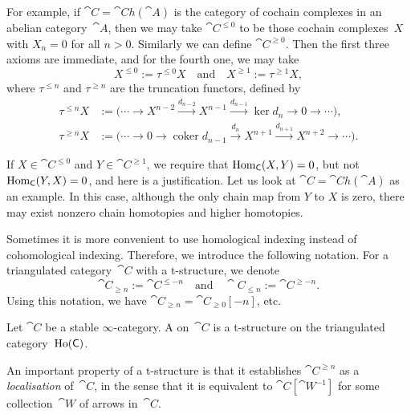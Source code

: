 For example, if $\cat{C}=\cat{Ch}(\cat{A})$ is the category of
cochain complexes in an abelian category~$\cat{A}$,
then we may take $\cat{C}^{\leq0}$ to be those cochain complexes~$X$
with $X_n=0$ for all $n>0$. Similarly we can define $\cat{C}^{\geq0}$.
Then the first three axioms are immediate, and for the fourth one, we may take 
\[ X^{\leq0}:=\tau^{\leq0}X\quad\text{and}\quad X^{\geq1}:=\tau^{\geq1}X, \]
where $\tau^{\leq n}$ and $\tau^{\geq n}$ are the truncation functors, defined by
\[ \begin{aligned}
    \tau^{\leq n}X&:=\bigl(\cdots\to X^{n-2}\xrightarrow{d_{n-2}}X^{n-1}\xrightarrow{d_{n-1}}
    \operatorname{ker}d_{n}\to0\to\cdots\bigr), \\
    \tau^{\geq n}X&:=\bigl(\cdots\to0\to\operatorname{coker}d_{n-1}\xrightarrow{d_n}X^{n+1}
    \xrightarrow{d_{n+1}}X^{n+2}\to\cdots\bigr).
\end{aligned} \]

\begin{remark}
    If $X\in\cat{C}^{\leq0}$ and $Y\in\cat{C}^{\geq1}$, we require that
    $\operatorname{Hom}_{\mathsf{C}}(X,Y)=0$, but not $\operatorname{Hom}_{\mathsf{C}}(Y,X)=0$,
    and here is a justification.
    Let us look at $\cat{C}=\cat{Ch}(\cat{A})$ as an example.
    In this case, although the only chain map from $Y$ to $X$ is zero,
    there may exist nonzero chain homotopies and higher homotopies. \varqed
\end{remark}

\begin{notation}
    Sometimes it is more convenient to use homological indexing instead of cohomological indexing.
    Therefore, we introduce the following notation.
    For a triangulated category~$\cat{C}$ with a t-structure, we denote 
    \[ \cat{C}_{\geq n}:=\cat{C}^{\leq-n}\quad\text{and}\quad\cat{C}_{\leq n}:=\cat{C}^{\geq-n}. \]
    Using this notation, we have $\cat{C}_{\geq n}=\cat{C}_{\geq0}[-n]$, etc. \varqed
\end{notation}

\begin{definition}
    Let $\cat{C}$ be a stable $\infty$-category.
    A  on~$\cat{C}$ is a t-structure on
    the triangulated category~$\operatorname{Ho}(\mathsf{C})$.
\end{definition}

An important property of a t-structure is that 
it establishes $\cat{C}^{\geq n}$ as a \emph{localisation} of~$\cat{C}$,
in the sense that it is equivalent to $\cat{C}[\cat{W}^{-1}]$ 
for some collection~$\cat{W}$ of arrows in~$\cat{C}$.

